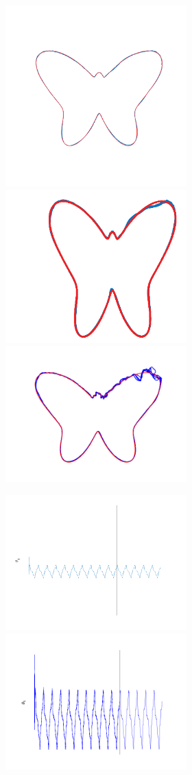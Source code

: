 \begin{figure}
\begin{subfigure}{\textwidth}
\begin{subfigure}{\textwidth}
        \includegraphics[trim=1.5cm 2.7cm 1.5cm 0.5cm, clip=true, height=.25\linewidth]{Figures/MATLAB/ST_T2_Seg2_TimeSeries.png} 
        \hspace{2em}
        \includegraphics[height=.2\linewidth]{Figures/Orig/ST_T2_TimeSeries.png} 
        \hspace{2em}
        \includegraphics[trim=1.5cm 1.2cm 1.5cm 1.2cm, clip=true,  height=.2\linewidth]{Figures/Python/ST_T2_Seg2_TimeSeries.png} 
        
        \end{subfigure}
        
        
        \textbf{}\begin{subfigure}{\textwidth}
        \centering
        
        \includegraphics[trim=2cm 0cm 0cm 0cm, clip=true,height=0.1\linewidth,width=.45\linewidth]{Figures/MATLAB/ST_T2_Seg2_Theta1.png}
        \includegraphics[trim=2cm 0cm 0cm 0cm, clip=true,height=0.1\linewidth,width=.45\linewidth]{Figures/Python/ST_T2_Seg2_Theta1.png}
        
        \end{subfigure}
        

\end{subfigure}
\end{figure}
